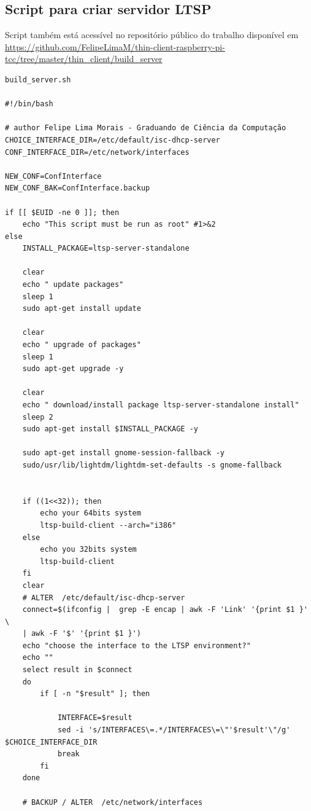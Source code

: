 \documentclass[
	12pt,				%
	openright,			%
	twoside,			%
	a4paper,			%
	chapter=TITLE,		%
	english,			%
	brazil				%
	]{abntex2}
\begin{document}
\begin{apendicesenv}

\partapendices

\chapter{Script para criar servidor LTSP}
\label{script:servidor}
Script também está acessível no repositório público do trabalho disponível em	 \url{https://github.com/FelipeLimaM/thin-client-raspberry-pi-tcc/tree/master/thin_client/build_server}

\begin{verbatim}
build_server.sh

#!/bin/bash

# author Felipe Lima Morais - Graduando de Ciência da Computação
CHOICE_INTERFACE_DIR=/etc/default/isc-dhcp-server
CONF_INTERFACE_DIR=/etc/network/interfaces

NEW_CONF=ConfInterface
NEW_CONF_BAK=ConfInterface.backup

if [[ $EUID -ne 0 ]]; then
    echo "This script must be run as root" #1>&2
else
    INSTALL_PACKAGE=ltsp-server-standalone
    
    clear
    echo " update packages"
    sleep 1
    sudo apt-get install update

    clear
    echo " upgrade of packages"
    sleep 1
    sudo apt-get upgrade -y 

    clear
    echo " download/install package ltsp-server-standalone install"
    sleep 2
    sudo apt-get install $INSTALL_PACKAGE -y

	sudo apt-get install gnome-session-fallback -y
	sudo/usr/lib/lightdm/lightdm-set-defaults -s gnome-fallback


    if ((1<<32)); then
        echo your 64bits system
        ltsp-build-client --arch="i386" 
    else
        echo you 32bits system
        ltsp-build-client
    fi
	clear
	# ALTER  /etc/default/isc-dhcp-server
	connect=$(ifconfig |  grep -E encap | awk -F 'Link' '{print $1 }' \
	| awk -F '$' '{print $1 }')
	echo "choose the interface to the LTSP environment?"
	echo ""	
	select result in $connect
	do
		if [ -n "$result" ]; then	
			
			INTERFACE=$result
			sed -i 's/INTERFACES\=.*/INTERFACES\=\"'$result'\"/g' $CHOICE_INTERFACE_DIR	
			break
		fi
	done

	# BACKUP / ALTER  /etc/network/interfaces
	

\end{verbatim}
\end{apendicesenv}
\end{document}
